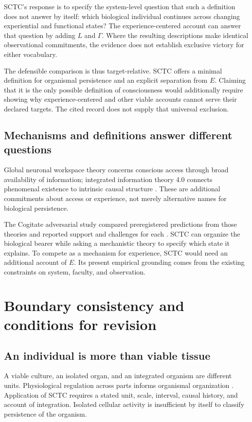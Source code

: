 \documentclass[11pt,letterpaper]{article}
\begin{document}
SCTC's response is to specify the system-level question that such a definition does not answer by itself: which biological individual continues across changing experiential and functional states? The experience-centered account can answer that question by adding $L$ and $\Gamma$. Where the resulting descriptions make identical observational commitments, the evidence does not establish exclusive victory for either vocabulary.

The defensible comparison is thus target-relative. SCTC offers a minimal definition for organismal persistence and an explicit separation from $E$. Claiming that it is the only possible definition of consciousness would additionally require showing why experience-centered and other viable accounts cannot serve their declared targets. The cited record does not supply that universal exclusion.

\subsection*{Mechanisms and definitions answer different questions}
Global neuronal workspace theory concerns conscious access through broad availability of information; integrated information theory 4.0 connects phenomenal existence to intrinsic causal structure \cite{Dehaene2011,Albantakis2023}. These are additional commitments about access or experience, not merely alternative names for biological persistence.

The Cogitate adversarial study compared preregistered predictions from those theories and reported support and challenges for each \cite{Cogitate2025}. SCTC can organize the biological bearer while asking a mechanistic theory to specify which state it explains. To compete as a mechanism for experience, SCTC would need an additional account of $E$. Its present empirical grounding comes from the existing constraints on system, faculty, and observation.

\section{Boundary consistency and conditions for revision}
\subsection*{An individual is more than viable tissue}
A viable culture, an isolated organ, and an integrated organism are different units. Physiological regulation across parts informs organismal organization \cite{BechtelBich2024}. Application of SCTC requires a stated unit, scale, interval, causal history, and account of integration. Isolated cellular activity is insufficient by itself to classify persistence of the organism.
\end{document}
